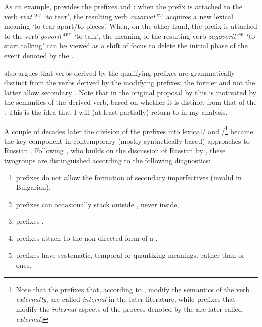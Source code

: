 As an example, \citet{Isachenko:60} provides the prefixes  and : when the prefix  is attached to the verb \textit{rvat'}$^{\textsc{ipf}}$ `to tear', the resulting verb \textit{razorvat'}$^{\textsc{pf}}$ acquires a new lexical meaning `to tear apart/to pieces'. When, on the other hand, the prefix  is attached to the verb \textit{govorit'}$^{\textsc{ipf}}$ `to talk', the meaning of the resulting verb \textit{zagovorit'}$^{\textsc{pf}}$ `to start talking' can be viewed as a shift of focus to delete the initial phase of the event denoted by the .

\citet{Isachenko:60} also argues that verbs derived by the qualifying prefixes are grammatically distinct from the verbs derived by the modifying prefixes: the former and not the latter allow secondary . Note that in the original proposal by \citet{Isachenko:60} this is motivated by the semantics of the derived verb, based on whether it is distinct from that of the . This is the idea that I will (at least partially) return to in my analysis.

A couple of decades later the division of the prefixes into lexical\slash {} and \slash {}\footnote{Note that the prefixes that, according to \citet{Isachenko:60}, modify the semantics of the verb \textit{externally}, are called \textit{internal} in the later literature, while prefixes that modify the \textit{internal} aspects of the process denoted by the  are later called \textit{external}.} became the key component in contemporary (mostly syn\-tac\-tically-based) approaches to Russian  \citep{Schoorlemmer:95, Babko-Malaya:99, Borik:02, Gehrke:04, Ramchand:04, Romanova:04, Romanova:06, Svenonius:04a, Svenonius:04b, DiSciullo:05}. Following \citet[229]{Svenonius:04b}, who builds on the discussion of Russian by \citet{Schoorlemmer:95}, these two\linebreak groups are distinguished according to the following diagnostics:

\begin{enumerate}
\item {} prefixes do not allow the formation of secondary imperfectives (invalid in Bulgarian), 
\item {} prefixes can occasionally stack outside , never inside, 
\item {} prefixes , 
\item {} prefixes attach to the non-directed form of a ,
\item {} prefixes have systematic, temporal or quantizing meanings, rather than  or  ones.
\end{enumerate}

